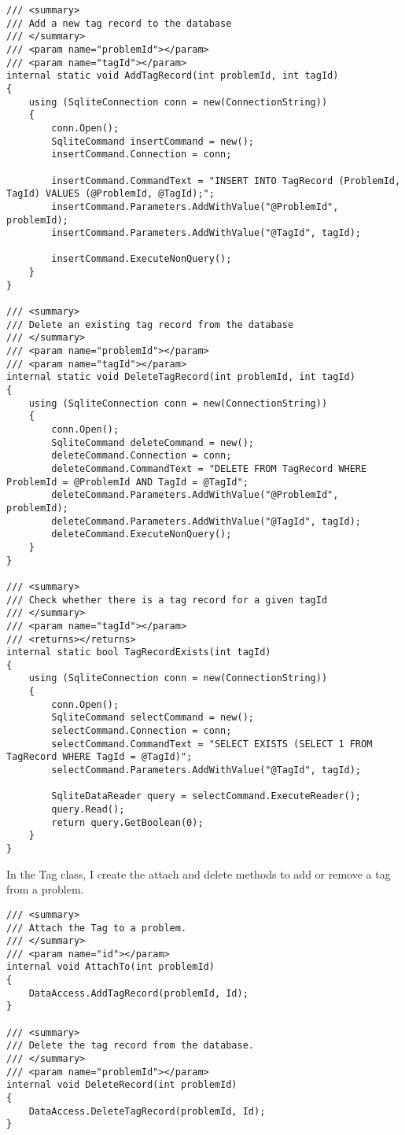 \documentclass[report.tex]{subfiles}
\begin{document}
\begin{verbatim}
/// <summary>
/// Add a new tag record to the database
/// </summary>
/// <param name="problemId"></param>
/// <param name="tagId"></param>
internal static void AddTagRecord(int problemId, int tagId)
{
    using (SqliteConnection conn = new(ConnectionString))
    {
        conn.Open();
        SqliteCommand insertCommand = new();
        insertCommand.Connection = conn;

        insertCommand.CommandText = "INSERT INTO TagRecord (ProblemId, TagId) VALUES (@ProblemId, @TagId);";
        insertCommand.Parameters.AddWithValue("@ProblemId", problemId);
        insertCommand.Parameters.AddWithValue("@TagId", tagId);

        insertCommand.ExecuteNonQuery();
    }
}

/// <summary>
/// Delete an existing tag record from the database
/// </summary>
/// <param name="problemId"></param>
/// <param name="tagId"></param>
internal static void DeleteTagRecord(int problemId, int tagId)
{
    using (SqliteConnection conn = new(ConnectionString))
    {
        conn.Open();
        SqliteCommand deleteCommand = new();
        deleteCommand.Connection = conn;
        deleteCommand.CommandText = "DELETE FROM TagRecord WHERE ProblemId = @ProblemId AND TagId = @TagId";
        deleteCommand.Parameters.AddWithValue("@ProblemId", problemId);
        deleteCommand.Parameters.AddWithValue("@TagId", tagId);
        deleteCommand.ExecuteNonQuery();
    }
}

/// <summary>
/// Check whether there is a tag record for a given tagId
/// </summary>
/// <param name="tagId"></param>
/// <returns></returns>
internal static bool TagRecordExists(int tagId)
{
    using (SqliteConnection conn = new(ConnectionString))
    {
        conn.Open();
        SqliteCommand selectCommand = new();
        selectCommand.Connection = conn;
        selectCommand.CommandText = "SELECT EXISTS (SELECT 1 FROM TagRecord WHERE TagId = @TagId)";
        selectCommand.Parameters.AddWithValue("@TagId", tagId);

        SqliteDataReader query = selectCommand.ExecuteReader();
        query.Read();
        return query.GetBoolean(0);
    }
}
\end{verbatim}

In the Tag class, I create the attach and delete methods to add or remove a tag from a problem.

\begin{verbatim}
/// <summary>
/// Attach the Tag to a problem.
/// </summary>
/// <param name="id"></param>
internal void AttachTo(int problemId)
{
    DataAccess.AddTagRecord(problemId, Id);
}

/// <summary>
/// Delete the tag record from the database.
/// </summary>
/// <param name="problemId"></param>
internal void DeleteRecord(int problemId)
{
    DataAccess.DeleteTagRecord(problemId, Id);
}
\end{verbatim}
\end{document}
